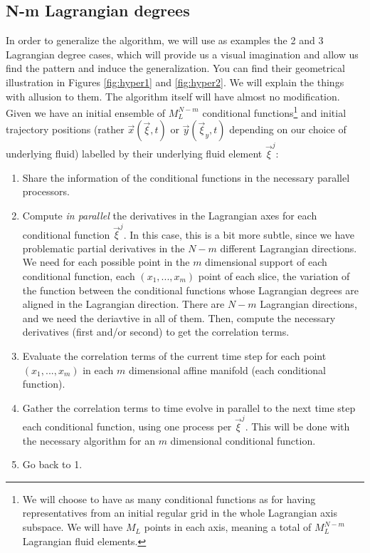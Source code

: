\documentclass[11pt, a4paper]{article} %
\begin{document}
\subsection*{N-m Lagrangian degrees}
In order to generalize the algorithm, we will use as examples the 2 and 3 Lagrangian degree cases, which will provide us a visual imagination and allow us find the pattern and induce the generalization. You can find their geometrical illustration in Figures \ref{fig:hyper1} and \ref{fig:hyper2}. We will explain the things with allusion to them. The algorithm itself will have almost no modification. Given we have an initial ensemble of $M_L^{N-m}$ conditional functions\footnote{We will choose to have as many conditional functions as for having representatives from an initial regular grid in the whole Lagrangian axis subspace. We will have $M_L$ points in each axis, meaning a total of $M_L^{N-m}$ Lagrangian fluid elements.} and initial trajectory positions (rather $\vec{x}(\vec{\xi},t)$ or $\vec{y}(\vec{\xi}_y,t)$ depending on our choice of underlying fluid) labelled by their underlying fluid element $\vec{\xi}^j$:
\begin{enumerate}
\item Share the information of the conditional functions in the necessary parallel processors.
\item Compute {\em in parallel} the derivatives in the Lagrangian axes for each conditional function $\vec{\xi}^j$. In this case, this is a bit more subtle, since we have problematic partial derivatives in the $N-m$ different Lagrangian directions. We need for each possible point in the $m$ dimensional support of each conditional function, each $(x_1,...,x_{m})$ point of each slice, the variation of the function between the conditional functions whose Lagrangian degrees are aligned in the Lagrangian direction. There are $N-m$ Lagrangian directions, and we need the deriavtive in all of them. Then, compute the necessary derivatives (first and/or second) to get the correlation terms.
\item Evaluate the correlation terms of the current time step for each point $(x_1,...,x_{m})$ in each $m$ dimensional affine manifold (each conditional function).

\item Gather the correlation terms to time evolve in parallel to the next time step each conditional function, using one process per $\vec{\xi}^j$. This will be done with the necessary algorithm for an $m$ dimensional conditional function.
\item Go back to 1.
\end{enumerate}
\end{document}

